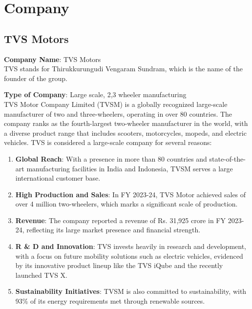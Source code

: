 \setcounter{page}{1}
\section{Company}

\subsection{TVS Motors}

\textbf{Company Name}: TVS Motors\\
TVS stands for Thirukkurungudi Vengaram Sundram, which is the name of the founder of the group.

\textbf{Type of Company}: Large scale, 2,3 wheeler manufacturing\\
TVS Motor Company Limited (TVSM) \cite{TVS_ANNUAL_REPORT} is a globally recognized large-scale manufacturer of two and three-wheelers, operating in over 80 countries. The company ranks as the fourth-largest two-wheeler manufacturer in the world, with a diverse product range that includes scooters, motorcycles, mopeds, and electric vehicles. TVS is considered a large-scale company for several reasons:
\begin{enumerate}
	\item \textbf{Global Reach}: With a presence in more than 80 countries and state-of-the-art manufacturing facilities in India and Indonesia, TVSM serves a large international customer base.

	\item \textbf{High Production and Sales}: In FY 2023-24, TVS Motor achieved sales of over 4 million two-wheelers, which marks a significant scale of production.

	\item \textbf{Revenue}: The company reported a revenue of Rs. 31,925 crore in FY 2023-24, reflecting its large market presence and financial strength.
	
	\item \textbf{R \& D and Innovation}: TVS invests heavily in research and development, with a focus on future mobility solutions such as electric vehicles, evidenced by its innovative product lineup like the TVS iQube and the recently launched TVS X.

	\item \textbf{Sustainability Initiatives}: TVSM is also committed to sustainability, with 93\% of its energy requirements met through renewable sources.
\end{enumerate}

